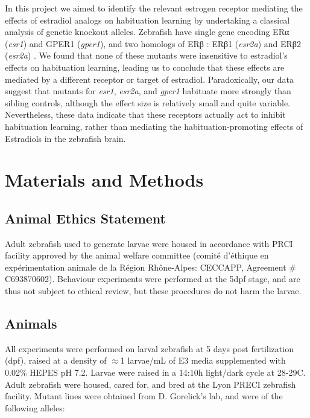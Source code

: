 \documentclass[9pt,lineno]{RandlettLab_elife}
\begin{document}
In this project we aimed to identify the relevant estrogen receptor mediating the effects of estradiol analogs on habituation learning by undertaking a classical analysis of genetic knockout alleles.
Zebrafish have single gene encoding ERα (\emph{esr1}) and GPER1 (\emph{gper1}), and two homologs of ERβ : ERβ1 (\emph{esr2a}) and ERβ2 (\emph{esr2a})  \citep{Romano2017-ep, Menuet2002-fo}.  
We found that none of these mutants were insensitive to estradiol's effects on habituation learning, leading us to conclude that these effects are mediated by a different receptor or target of estradiol. 
Paradoxically, our data suggest that mutants for \emph{esr1}, \emph{esr2a}, and \emph{gper1} habituate more strongly than sibling controls, although the effect size is relatively small and quite variable. Nevertheless, these data indicate that these receptors actually act to inhibit habituation learning, rather than mediating the habituation-promoting effects of Estradiols in the zebrafish brain. 


\section{Materials and Methods}

\subsection{Animal Ethics Statement}

Adult zebrafish used to generate larvae were housed in accordance with PRCI facility approved by the animal welfare committee (comité d’éthique en expérimentation animale de la Région Rhône-Alpes: CECCAPP, Agreement \# C693870602). 
Behaviour experiments were performed at the 5dpf stage, and are thus not subject to ethical review, but these procedures do not harm the larvae. 

\subsection{Animals}

All experiments were performed on larval zebrafish at 5 days post fertilization (dpf), raised at a density of $\approx$1 larvae/mL of E3 media supplemented with 0.02\% HEPES pH 7.2. 
Larvae were raised in a 14:10h light/dark cycle at 28-29\degree{}C. 
Adult zebrafish were housed, cared for, and bred at the Lyon PRECI zebrafish facility. 
Mutant lines were obtained from D. Gorelick's lab, and were of the following alleles: 
\end{document}
